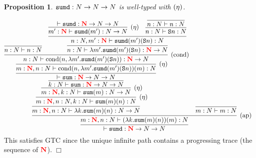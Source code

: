 \documentclass{article}
\newcommand{\bfColor}[2]{{\bf \color{#1}{#2}}}
\newcommand{\Reta}{\hbox{$(\eta)$}}
\newcommand{\Rap}{\hbox{$(\text{ap})$}}
\newcommand{\Rcond}{\hbox{$(\text{cond})$}}
\newcommand{\Sum}{{\tt sum}}
\newcommand{\Sumd}{{\tt sumd}}
\newcommand{\Cond}[2]{\text{cond}(#1,#2)}
\newcommand{\Suc}[1]{{\tt S}#1}
\newcommand{\N}{N}
\newcommand{\rN}{\bfColor{red}{N}}
\newtheorem{proposition}[theorem]{Proposition}
\newenvironment{proof}[1][Proof]{\begin{trivlist}
\item[\hskip \labelsep {\bfseries #1}]}{\end{trivlist}}
\begin{document}
\begin{proposition}
  $\Sumd:\N\to\N\to\N$ is well-typed with $\Reta$.
\end{proposition}
\begin{proof}
  \[
  \infer{
    \vdash \Sumd:\rN\to\N\to\N
  }{
    \infer[\Rap]{
      m:\rN, n:\N \vdash (\lambda k.\Sum(m)(n))(m):\N
    }{
      \infer{
        m:\rN, n:\N \vdash \lambda k.\Sum(m)(n):\N\to\N
      }{
        \infer[\Reta]{
          m:\rN, n:\N, k:\N \vdash \Sum(m)(n):\N
        }{
          \infer[\Reta]{
            m:\rN, k:\N \vdash \Sum(m):\N\to\N
          }{
            \infer{
              k:\N \vdash \Sum:\rN\to\N\to\N
            }{
              \infer{
                \vdash \Sum:\rN\to\N\to\N
              }{
                \infer[\Reta]{
                  m:\rN,n:\N\vdash\Cond{n}{\lambda m'.\Sumd(m')(\Suc{n})}(m):\N
                }{
                  \infer[\Rcond]{
                    n:\N\vdash\Cond{n}{\lambda m'.\Sumd(m')(\Suc{n})}:\rN\to\N
                  }{
                    \infer{
                      n:\N \vdash n:\N
                    }{}
                    &
                    \infer{
                      n:\N\vdash\lambda m'.\Sumd(m')(\Suc{n}):\rN\to\N
                    }{
                      \infer{
                        n:\N,m':\rN\vdash\Sumd(m')(\Suc{n}):\N
                      }{
                        \infer[\Reta]{
                          m':\rN\vdash\Sumd(m'):\N\to\N
                        }{
                          \vdash\Sumd:\rN\to\N\to\N
                        }
                        &
                        \infer{
                          n:\N\vdash\Suc{n}:\N
                        }{
                          \infer{
                            n:\N\vdash n:\N
                          }{}
                        }
                      }
                    }
                  }
                }
              }
            }
          }
        }
      }
      &
      \infer{
        m:\N \vdash m:\N
      }{}
    }
  }
  \]
  This satisfies GTC
  since the unique infinite path contains a progressing trace (the sequence of $\rN$).
  \hfill$\Box$
\end{proof}
\end{document}
